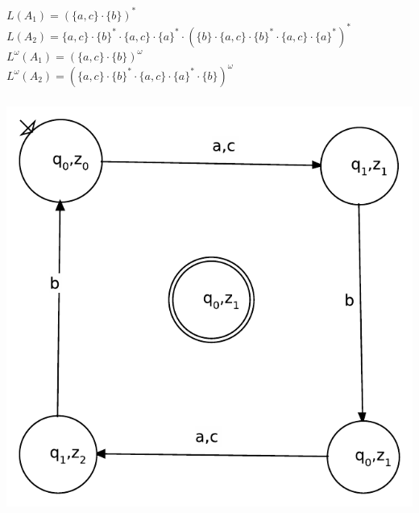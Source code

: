 \documentclass[a4paper,12pt]{scrartcl}
\title{\blatt}
\date{Gruppe 06}
\author{Sabrina Buczko 6663234, Julian Deinert 6535880, Rafael Heid 6704828}
\begin{document}
\maketitle
\newpage
\setcounter{section}{2}
\section{}
\setcounter{subsection}{2}
\subsection{}
\subsubsection{}
$L(A_1)=(\{a,c\}\cdot\{b\})^*$\\
$L(A_2)=\{a,c\}\cdot\{b\}^* \cdot \{a,c\}\cdot \{a\}^* \cdot(\{b\}\cdot \{a,c\}\cdot\{b\}^* \cdot \{a,c\}\cdot \{a\}^*)^*$\\
$L^\omega (A_1)=(\{a,c\}\cdot\{b\})^\omega$\\
$L^\omega (A_2)=(\{a,c\}\cdot\{b\}^* \cdot \{a,c\}\cdot \{a\}^* \cdot\{b\})^\omega$

\subsubsection{}
\includegraphics[scale=0.7]{334.pdf}
\end{document}
